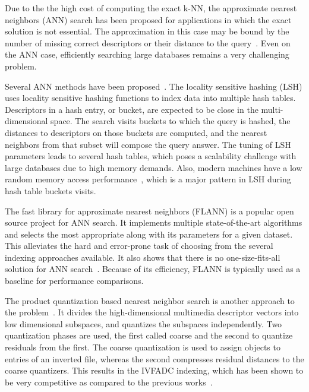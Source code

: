 Due to the the high cost of computing the exact k-NN, the approximate nearest neighbors (ANN) search has been proposed for applications in which the exact solution is not essential. The approximation in this case may be bound by the number of missing correct descriptors or their distance to the query~\cite{Indyk:1998:ANN:276698.276876}. Even on the ANN case, efficiently searching large databases remains a very challenging problem.

Several ANN methods have been proposed~\cite{Gionis:1999:SSH:645925.671516,5432202,NIPS2009_3864,6809191,Muja2009331}. The locality sensitive hashing (LSH) uses locality sensitive hashing functions to index data into multiple hash tables. Descriptors in a hash entry, or bucket, are expected to be close in the multi-dimensional space. The search visits buckets to which the query is hashed, the distances to descriptors on those buckets are computed, and the nearest neighbors from that subset will compose the query answer. The tuning of LSH parameters leads to several hash tables, which poses a scalability challenge with large databases due to high memory demands. Also, modern machines have a low random memory access performance~\cite{TeodoroKKCS14}, which is a major pattern in LSH during hash table buckets visits. 

The fast library for approximate nearest neighbors (FLANN) is a popular open source project for ANN search. It implements multiple state-of-the-art algorithms and selects the most appropriate along with its parameters for a given dataset. This alleviates the hard and error-prone task of choosing from the several indexing approaches
available. 
It also shows that there is no one-size-fits-all solution for ANN search~\cite{Muja2009331}. Because of its efficiency, FLANN is typically used as a baseline for performance comparisons.

The product quantization based nearest neighbor search is another approach to the problem~\cite{5432202}. 
It divides the high-dimensional multimedia descriptor vectors into low dimensional subspaces, 
and quantizes the subspaces independently. Two quantization phases are used, the first 
called coarse and the second to quantize residuals from the first. The 
coarse quantization is used to assign objects to entries of an inverted file, whereas 
the second compresses residual distances to the coarse quantizers. This results 
in the IVFADC indexing, which has been shown to be very competitive as
compared to the previous works~\cite{5432202}. 

